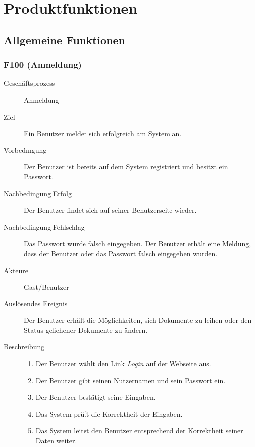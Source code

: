 
\chapter{Produktfunktionen}

\section{Allgemeine Funktionen}
\subsection{F100 (Anmeldung)}
\label{F:Anmeldung}
\begin{description}
  \item[Geschäftsprozess]Anmeldung
  \item[Ziel]Ein Benutzer meldet sich erfolgreich am System an.
  \item[Vorbedingung]Der Benutzer ist bereits auf dem System registriert und besitzt ein Passwort.
  \item[Nachbedingung Erfolg]Der Benutzer findet sich auf seiner Benutzerseite wieder.
  \item[Nachbedingung Fehlschlag]Das Passwort wurde falsch eingegeben. Der Benutzer erhält eine Meldung, dass der Benutzer oder das Passwort falsch eingegeben wurden.
  \item[Akteure]Gast/Benutzer
  \item[Auslösendes Ereignis]Der Benutzer erhält die Möglichkeiten, sich Dokumente zu leihen oder den Status geliehener Dokumente zu ändern.
  \item[Beschreibung]\hfill
    \begin{enumerate}
      \item Der Benutzer wählt den Link \emph{Login} auf der Webseite aus.
      \item Der Benutzer gibt seinen Nutzernamen und sein Passwort ein.
      \item Der Benutzer bestätigt seine Eingaben.
      \item Das System prüft die Korrektheit der Eingaben.
      \item Das System leitet den Benutzer entsprechend der Korrektheit seiner Daten weiter.
    \end{enumerate}
\end{description}

